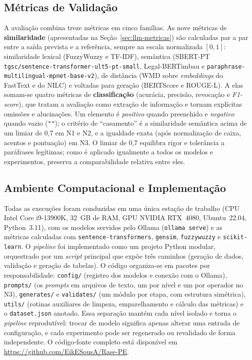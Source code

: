 \documentclass[a4paper,fleqn]{cas-sc}
\begin{document}
\subsection{Métricas de Validação}\label{sec:metricas}
A avaliação combina treze métricas em cinco famílias. As nove métricas de \textbf{similaridade} (apresentadas na Seção~\ref{sec:llm-metricas}) são calculadas par a par entre a saída prevista e a referência, sempre na escala normalizada $[0,1]$: similaridade lexical (FuzzyWuzzy e TF-IDF), semântica (SBERT-PT \texttt{tgsc/sentence-transformer-ult5-pt-small}, Legal-BERTimbau e \texttt{paraphrase-multilingual-mpnet-base-v2}), de distância (WMD sobre \textit{embeddings} do FastText e do NILC) e voltadas para geração (BERTScore e ROUGE-L). A elas somam-se quatro métricas de \textbf{classificação} (acurácia, precisão, revocação e \textit{F1-score}), que tratam a avaliação como extração de informação e tornam explícitas omissões e alucinações. Um elemento é \textit{positivo} quando preenchido e \textit{negativo} quando vazio (\verb|""|); o critério de ``casamento'' é a similaridade semântica acima de um limiar de 0{,}7 em N1 e N2, e a igualdade exata (após normalização de caixa, acentos e pontuação) em N3. O limiar de 0{,}7 equilibra rigor e tolerância a paráfrases legítimas; como é aplicado igualmente a todos os modelos e experimentos, preserva a comparabilidade relativa entre eles.

\subsection{Ambiente Computacional e Implementação}\label{sec:ambiente}
Todas as execuções foram conduzidas em uma única estação de trabalho (CPU Intel Core i9-13900K, 32~GB de RAM, GPU NVIDIA RTX~4080, Ubuntu~22.04, Python~3.11), com os modelos servidos pelo Ollama (\texttt{ollama serve}) e as métricas calculadas com \texttt{sentence-transformers}, \texttt{gensim}, \texttt{fuzzywuzzy} e \texttt{scikit-learn}. O \textit{pipeline} foi implementado como um projeto Python modular, orquestrado por um \textit{script} principal que expõe três caminhos (geração de dados, validação e geração de tabelas). O código organiza-se em pacotes por responsabilidade: \texttt{config/} (registro dos modelos e conexão com o Ollama), \texttt{prompts/} (os \textit{prompts} em arquivos de texto, um por nível e um por operador no N3), \texttt{generates/} e \texttt{validates/} (um módulo por etapa, com estrutura simétrica), \texttt{utils/} (rotinas auxiliares de limpeza, emparelhamento e cálculo das métricas) e o \texttt{dataset.json} anotado. Essa separação mantém cada nível isolado e torna o \textit{pipeline} reprodutível: trocar de modelo significa apenas alterar uma entrada de configuração, e cada experimento pode ser regenerado ou revalidado de forma independente. O código-fonte completo está disponível em \url{https://github.com/EikESousA/Rase-PE}.
\end{document}
